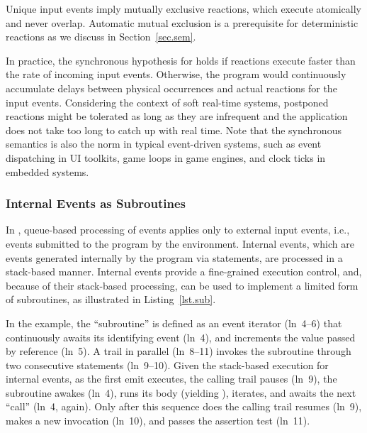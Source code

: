 Unique input events imply mutually exclusive reactions, which execute
atomically and never overlap.
%
Automatic mutual exclusion is a prerequisite for deterministic reactions as
we discuss in Section~\ref{sec.sem}.
%

In practice, the synchronous hypothesis for \CEU holds if reactions execute
faster than the rate of incoming input events.
%
Otherwise, the program would continuously accumulate delays between physical
occurrences and actual reactions for the input events.
%
Considering the context of soft real-time systems,
postponed reactions might be tolerated as long as they are infrequent and the
application does not take too long to catch up with real time.
%
Note that the synchronous semantics is also the norm in typical event-driven
systems, such as event dispatching in UI toolkits, game loops in game engines,
and clock ticks in embedded systems.

\subsubsection{Internal Events as Subroutines}

In \CEU, queue-based processing of events applies only to external input
events, i.e., events submitted to the program by the environment.
%
Internal events, which are events generated internally by the program via
 statements, are processed in a stack-based manner.
%
Internal events provide a fine-grained execution control, and, because of their
stack-based processing, can be used to implement a limited form of subroutines,
as illustrated in Listing~\ref{lst.sub}.

In the example, the ``subroutine''  is defined as an event iterator
(ln~4--6) that continuously awaits its identifying event (ln~4), and
increments the value passed by reference (ln~5).
%
A trail in parallel (ln~8--11) invokes the subroutine through two consecutive
 statements (ln~9--10).
%
Given the stack-based execution for internal events, as the first emit
executes, the calling trail pauses (ln~9), the subroutine awakes (ln~4), runs
its body (yielding ), iterates, and awaits the next ``call'' (ln~4,
again).
%
Only after this sequence does the calling trail resumes (ln~9), makes a new
invocation (ln~10), and passes the assertion test (ln~11).

